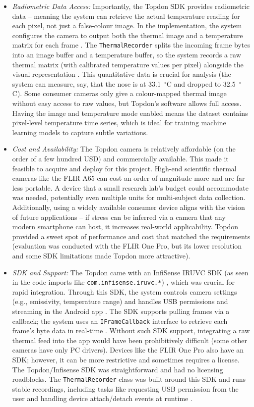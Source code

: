 \begin{itemize}
    \item \emph{Radiometric Data Access:} Importantly, the Topdon SDK provides radiometric data -- meaning the system can retrieve the actual temperature reading for each pixel, not just a false-colour image. In the implementation, the system configures the camera to output both the thermal image and a temperature matrix for each frame \cite{ref20}. The \texttt{ThermalRecorder} splits the incoming frame bytes into an image buffer and a temperature buffer, so the system records a raw thermal matrix (with calibrated temperature values per pixel) alongside the visual representation \cite{ref20}. This quantitative data is crucial for analysis (the system can measure, say, that the nose is at 33.1~$^\circ$C and dropped to 32.5~$^\circ$C). Some consumer cameras only give a colour-mapped thermal image without easy access to raw values, but Topdon's software allows full access. Having the image and temperature mode enabled \cite{ref20} means the dataset contains pixel-level temperature time series, which is ideal for training machine learning models to capture subtle variations.
    \item \emph{Cost and Availability:} The Topdon camera is relatively affordable (on the order of a few hundred USD) and commercially available. This made it feasible to acquire and deploy for this project. High-end scientific thermal cameras like the FLIR A65 can cost an order of magnitude more and are far less portable. A device that a small research lab's budget could accommodate was needed, potentially even multiple units for multi-subject data collection. Additionally, using a widely available consumer device aligns with the vision of future applications -- if stress can be inferred via a camera that any modern smartphone can host, it increases real-world applicability. Topdon provided a sweet spot of performance and cost that matched the requirements (evaluation was conducted with the FLIR One Pro, but its lower resolution and some SDK limitations made Topdon more attractive).
    \item \emph{SDK and Support:} The Topdon came with an InfiSense IRUVC SDK (as seen in the code imports like \texttt{com.infisense.iruvc.*}) \cite{ref16}, which was crucial for rapid integration. Through this SDK, the system controls camera settings (e.g., emissivity, temperature range) and handles USB permissions and streaming in the Android app \cite{ref16}. The SDK supports pulling frames via a callback; the system uses an \texttt{IFrameCallback} interface to retrieve each frame's byte data in real-time \cite{ref16}. Without such SDK support, integrating a raw thermal feed into the app would have been prohibitively difficult (some other cameras have only PC drivers). Devices like the FLIR One Pro also have an SDK; however, it can be more restrictive and sometimes requires a license. The Topdon/Infisense SDK was straightforward and had no licensing roadblocks. The \texttt{ThermalRecorder} class was built around this SDK and runs stable recordings, including tasks like requesting USB permission from the user and handling device attach/detach events at runtime \cite{ref16}.

\end{itemize}
